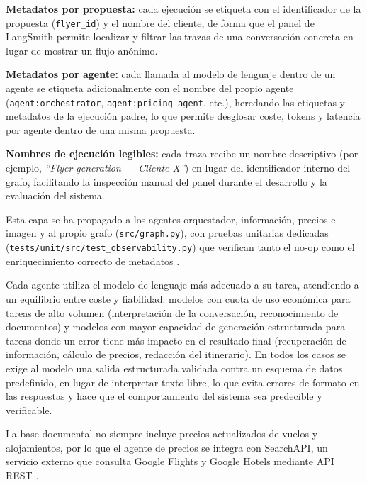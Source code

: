\begin{tfmbullets}
\item \textbf{Metadatos por propuesta:} cada ejecución se etiqueta con el identificador de la propuesta (\texttt{flyer\_id}) y el nombre del cliente, de forma que el panel de LangSmith permite localizar y filtrar las trazas de una conversación concreta en lugar de mostrar un flujo anónimo.
\item \textbf{Metadatos por agente:} cada llamada al modelo de lenguaje dentro de un agente se etiqueta adicionalmente con el nombre del propio agente (\texttt{agent:orchestrator}, \texttt{agent:pricing\_agent}, etc.), heredando las etiquetas y metadatos de la ejecución padre, lo que permite desglosar coste, tokens y latencia por agente dentro de una misma propuesta.
\item \textbf{Nombres de ejecución legibles:} cada traza recibe un nombre descriptivo (por ejemplo, \textit{``Flyer generation — Cliente X''}) en lugar del identificador interno del grafo, facilitando la inspección manual del panel durante el desarrollo y la evaluación del sistema.
\end{tfmbullets}

Esta capa se ha propagado a los agentes orquestador, información, precios e imagen y al propio grafo (\texttt{src/graph.py}), con pruebas unitarias dedicadas (\texttt{tests/unit/src/test\_observability.py}) que verifican tanto el no-op como el enriquecimiento correcto de metadatos \parencite{langsmith2026docs}.

Cada agente utiliza el modelo de lenguaje más adecuado a su tarea, atendiendo a un equilibrio entre coste y fiabilidad: modelos con cuota de uso económica para tareas de alto volumen (interpretación de la conversación, reconocimiento de documentos) y modelos con mayor capacidad de generación estructurada para tareas donde un error tiene más impacto en el resultado final (recuperación de información, cálculo de precios, redacción del itinerario). En todos los casos se exige al modelo una salida estructurada validada contra un esquema de datos predefinido, en lugar de interpretar texto libre, lo que evita errores de formato en las respuestas y hace que el comportamiento del sistema sea predecible y verificable.


La base documental no siempre incluye precios actualizados de vuelos y alojamientos, por lo que el agente de precios se integra con SearchAPI, un servicio externo que consulta Google Flights y Google Hotels mediante API REST \parencite{searchapi2026flights,searchapi2026hotels}.

